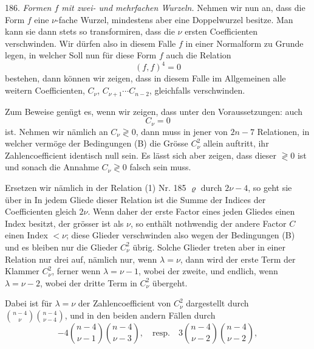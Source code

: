186. \textit{Formen $f$ mit zwei- und mehrfachen Wurzeln.} Nehmen wir
nun an, dass die Form $f$ eine $\nu$-fache Wurzel, mindestens aber
eine Doppelwurzel besitze. Man kann sie dann stets so transformiren,
dass die $\nu$ ersten Coefficienten verschwinden. Wir d\"urfen also in
diesem Falle $f$ in einer Normalform zu Grunde legen, in welcher
Soll nun f\"ur diese Form $f$ auch die Relation
\[
(f,f)^4 = 0
\]
bestehen, dann k\"onnen wir zeigen, dass in diesem Falle im Allgemeinen
alle weitern Coefficienten, $C_\nu$, $C_{\nu+1}\cdots C_{n-2}$,
gleichfalls verschwinden.

Zum Beweise gen\"ugt es, wenn wir zeigen, dass unter den
Voraussetzungen:
auch
\[
C_\nu = 0
\]
ist. Nehmen wir n\"amlich an $C_\nu \gtrless 0$, dann muss in jener
von $2n-7$ Relationen, in welcher verm\"oge der Bedingungen (B) die
Gr\"osse $C_\nu^2$ allein auftritt, ihr Zahlencoefficient identisch
null sein. Es l\"asst sich aber zeigen, dass dieser $\gtrless 0$ ist
und sonach die Annahme $C_\nu \gtrless 0$ falsch sein muss.

Ersetzen wir n\"amlich in der Relation (1) Nr. 185 $\varrho$ durch
$2\nu-4$, so geht sie \"uber in
In jedem Gliede dieser Relation ist die Summe der Indices der
Coefficienten gleich $2\nu$. Wenn daher der erste Factor eines jeden
Gliedes einen Index besitzt, der gr\"osser ist als $\nu$, so enth\"alt
nothwendig der andere Factor $C$ einen Index $< \nu$; diese Glieder
verschwinden also wegen der Bedingungen (B) und es bleiben nur die
Glieder $C_\nu^2$ \"ubrig. Solche Glieder treten aber in einer
Relation nur drei auf, n\"amlich nur, wenn $\lambda = \nu$, dann wird
der erste Term der Klammer $C_\nu^2$, ferner wenn $\lambda = \nu-1$,
wobei der zweite, und endlich, wenn $\lambda = \nu-2$, wobei der
dritte Term in $C_\nu^2$ \"ubergeht.

Dabei ist f\"ur $\lambda = \nu$ der Zahlencoefficient von $C_\nu^2$
dargestellt durch $\binom{n-4}{\nu}\binom{n-4}{\nu-4}$, und in den
beiden andern F\"allen durch
\[
-4\binom{n-4}{\nu-1}\binom{n-4}{\nu-3},\quad\text{resp.}\quad 3\binom{n-4}{\nu-2}\binom{n-4}{\nu-2},
\]


